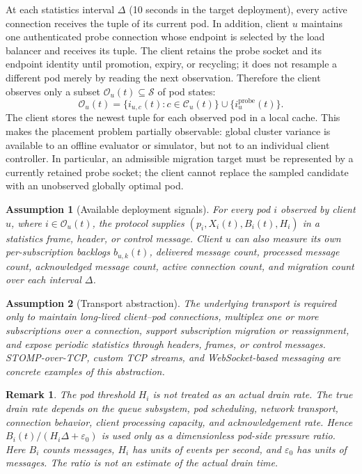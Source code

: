 \documentclass[manuscript]{acmart}
\newtheorem{assumption}{Assumption}
\newtheorem{remark}{Remark}
\begin{document}
At each statistics interval $\Delta$ (10 seconds in the target deployment),
every active connection receives the tuple of its current pod. In addition,
client $u$ maintains one authenticated probe connection whose endpoint is
selected by the load balancer and receives its tuple. The client
retains the probe socket and its endpoint identity until promotion, expiry, or
recycling; it does not resample a different pod merely by reading the next
observation. Therefore the client observes only a subset
$\mathcal{O}_u(t)\subseteq\mathcal{S}$ of pod states:
\begin{equation}
	\mathcal{O}_u(t)=
	\{i_{u,c}(t):c\in\mathcal{C}_u(t)\}
	\cup
	\{i^{\mathrm{probe}}_u(t)\}.
\end{equation}
The client stores the newest tuple for each observed pod in a local cache. This
makes the placement problem partially observable: global cluster variance is
available to an offline evaluator or simulator, but not to an individual client
controller. In particular, an admissible migration target must be represented
by a currently retained probe socket; the client cannot replace the sampled
candidate with an unobserved globally optimal pod.

\begin{assumption}[Available deployment signals]
For every pod $i$ observed by client $u$, where $i\in\mathcal{O}_u(t)$, the
protocol supplies $(p_i,X_i(t),B_i(t),H_i)$ in a statistics frame, header, or
control message. Client
$u$ can also measure its own per-subscription backlogs $b_{u,k}(t)$, delivered
message count, processed message count, acknowledged message count, active
connection count, and migration count over each interval $\Delta$.
\end{assumption}

\begin{assumption}[Transport abstraction]
The underlying transport is required only to maintain long-lived client--pod
connections, multiplex one or more subscriptions over a connection, support
subscription migration or reassignment, and expose periodic statistics through
headers, frames, or control messages. STOMP-over-TCP, custom TCP streams, and
WebSocket-based messaging are concrete examples of this abstraction.
\end{assumption}

\begin{remark}
The pod threshold $H_i$ is not treated as an actual drain rate. The true drain
rate depends on the queue subsystem, pod scheduling, network transport,
connection behavior, client processing capacity, and acknowledgement rate.
Hence $B_i(t)/(H_i\Delta+\varepsilon_0)$ is used only as a dimensionless
pod-side pressure ratio. Here $B_i$ counts messages, $H_i$ has units of
events per second, and $\varepsilon_0$ has units of messages. The ratio is
not an estimate of the actual drain time.
\end{remark}
\end{document}
